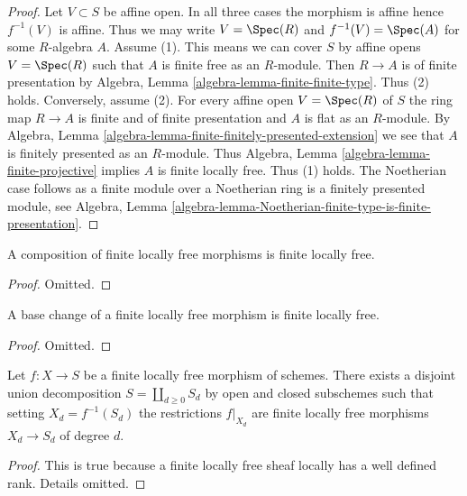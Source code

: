 \begin{proof}
Let $V \subset S$ be affine open. In all three cases
the morphism is affine hence $f^{-1}(V)$ is affine.
Thus we may write $V = \Spec(R)$ and $f^{-1}(V) = \Spec(A)$
for some $R$-algebra $A$.
Assume (1). This means we can cover $S$ by affine opens
$V = \Spec(R)$ such that $A$ is finite free as an $R$-module.
Then $R \to A$ is of finite presentation by
Algebra, Lemma \ref{algebra-lemma-finite-finite-type}.
Thus (2) holds. Conversely, assume (2).
For every affine open $V = \Spec(R)$ of $S$ the ring map
$R \to A$ is finite and of finite presentation and $A$ is flat
as an $R$-module. By
Algebra, Lemma \ref{algebra-lemma-finite-finitely-presented-extension}
we see that $A$ is finitely presented as an $R$-module.
Thus Algebra, Lemma \ref{algebra-lemma-finite-projective}
implies $A$ is finite locally free. Thus (1) holds.
The Noetherian case follows as a finite module over a Noetherian ring
is a finitely presented module, see Algebra,
Lemma \ref{algebra-lemma-Noetherian-finite-type-is-finite-presentation}.
\end{proof}

\begin{lemma}
\label{lemma-composition-finite-locally-free}
A composition of finite locally free morphisms is finite locally free.
\end{lemma}

\begin{proof}
Omitted.
\end{proof}

\begin{lemma}
\label{lemma-base-change-finite-locally-free}
A base change of a finite locally free morphism is finite locally free.
\end{lemma}

\begin{proof}
Omitted.
\end{proof}

\begin{lemma}
\label{lemma-finite-locally-free}
Let $f : X \to S$ be a finite locally free morphism of schemes.
There exists a disjoint union decomposition
$S = \coprod_{d \geq 0} S_d$ by open and closed subschemes
such that setting $X_d = f^{-1}(S_d)$ the restrictions
$f|_{X_d}$ are finite locally free morphisms $X_d \to S_d$
of degree $d$.
\end{lemma}

\begin{proof}
This is true because a finite locally free sheaf locally has
a well defined rank. Details omitted.
\end{proof}


